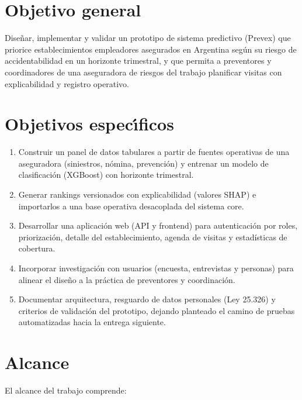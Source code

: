 \section{Objetivo general}\label{sec:objetivo-general}

Dise\~nar, implementar y validar un prototipo de sistema predictivo (Prevex) que priorice establecimientos empleadores asegurados en Argentina seg\'un su riesgo de accidentabilidad en un horizonte trimestral, y que permita a preventores y coordinadores de una aseguradora de riesgos del trabajo planificar visitas con explicabilidad y registro operativo.

\section{Objetivos espec\'{\i}ficos}\label{sec:objetivos-especificos}

\begin{enumerate}
	\item Construir un panel de datos tabulares a partir de fuentes operativas de una aseguradora (siniestros, n\'omina, prevenci\'on) y entrenar un modelo de clasificaci\'on (XGBoost) con horizonte trimestral.
	\item Generar rankings versionados con explicabilidad (valores SHAP) e importarlos a una base operativa desacoplada del sistema core.
	\item Desarrollar una aplicaci\'on web (API y frontend) para autenticaci\'on por roles, priorizaci\'on, detalle del establecimiento, agenda de visitas y estad\'isticas de cobertura.
	\item Incorporar investigaci\'on con usuarios (encuesta, entrevistas y personas) para alinear el dise\~no a la pr\'actica de preventores y coordinaci\'on.
	\item Documentar arquitectura, resguardo de datos personales (Ley 25.326) y criterios de validaci\'on del prototipo, dejando planteado el camino de pruebas automatizadas hacia la entrega siguiente.
\end{enumerate}

\section{Alcance}\label{sec:alcance}

El alcance del trabajo comprende:

